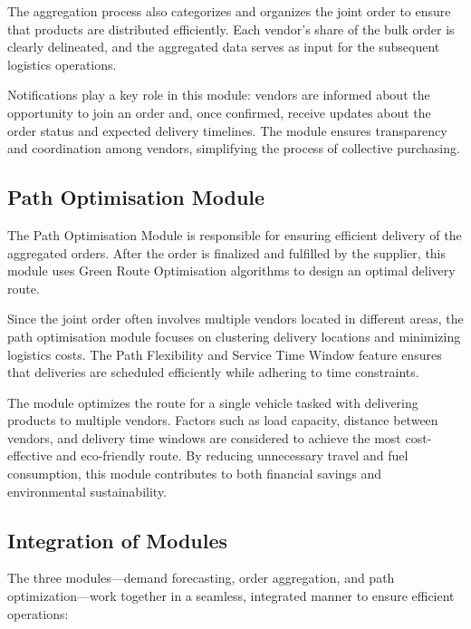 The aggregation process also categorizes and organizes the joint order to ensure that products are distributed efficiently. Each vendor's share of the bulk order is clearly delineated, and the aggregated data serves as input for the subsequent logistics operations.

Notifications play a key role in this module: vendors are informed about the opportunity to join an order and, once confirmed, receive updates about the order status and expected delivery timelines. The module ensures transparency and coordination among vendors, simplifying the process of collective purchasing.

\subsection{Path Optimisation Module}

The Path Optimisation Module is responsible for ensuring efficient delivery of the aggregated orders. After the order is finalized and fulfilled by the supplier, this module uses Green Route Optimisation algorithms to design an optimal delivery route.

Since the joint order often involves multiple vendors located in different areas, the path optimisation module focuses on clustering delivery locations and minimizing logistics costs. The Path Flexibility and Service Time Window feature ensures that deliveries are scheduled efficiently while adhering to time constraints.

The module optimizes the route for a single vehicle tasked with delivering products to multiple vendors. Factors such as load capacity, distance between vendors, and delivery time windows are considered to achieve the most cost-effective and eco-friendly route. By reducing unnecessary travel and fuel consumption, this module contributes to both financial savings and environmental sustainability.

\subsection{Integration of Modules}

The three modules—demand forecasting, order aggregation, and path optimization—work together in a seamless, integrated manner to ensure efficient operations:

